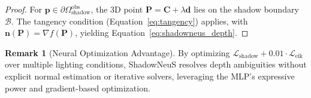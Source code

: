 \documentclass[12pt]{article}
\newcommand{\vect}[1]{\bm{#1}}
\theoremstyle{definition}
\newtheorem{remark}{Remark}[subsection]
\begin{document}
\begin{proof}
For \(\vect{p} \in \partial\Omega_{\text{shadow}}^{\text{obs}}\), the 3D point \(\mathbf{P} = \mathbf{C} + \lambda \mathbf{d}\) lies on the shadow boundary \(\mathcal{B}\). The tangency condition (Equation~\eqref{eq:tangency}) applies, with \(\vect{n}(\mathbf{P}) = \nabla f(\mathbf{P})\), yielding Equation~\eqref{eq:shadowneus_depth}.
\end{proof}

\begin{remark}[Neural Optimization Advantage]
By optimizing \(\mathcal{L}_{\text{shadow}} + 0.01 \cdot \mathcal{L}_{\text{eik}}\) over multiple lighting conditions, ShadowNeuS resolves depth ambiguities without explicit normal estimation or iterative solvers, leveraging the MLP’s expressive power and gradient-based optimization.
\end{remark}








\end{document}
